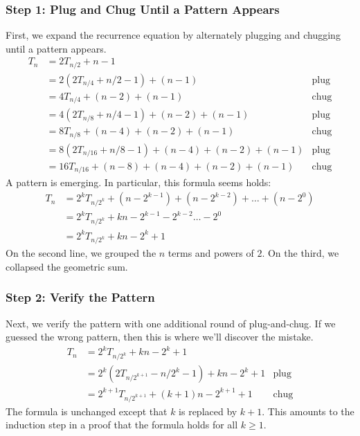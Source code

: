 \subsubsection*{Step 1: Plug and Chug Until a Pattern Appears}

First, we expand the recurrence equation by alternately plugging and
chugging until a pattern appears.
\begin{align*}
T_n & = 2T_{n/2} + n - 1 \\
  & = 2 (2 T_{n/4} + n/2 - 1)  + (n - 1) & \text{plug} \\
  & = 4 T_{n/4} + (n - 2) + (n - 1) & \text{chug} \\
  & = 4 (2 T_{n/8} + n / 4 - 1) + (n - 2) + (n - 1) & \text{plug} \\
  & = 8 T_{n/8} + (n - 4) + (n - 2) + (n - 1) & \text{chug} \\
  & = 8 (2 T_{n/16} + n / 8 - 1) +  (n - 4) + (n - 2) + (n - 1) &
  \text{plug} \\
  & = 16 T_{n/16} + (n - 8) + (n - 4) + (n - 2) + (n - 1) & \text{chug}
\end{align*}
A pattern is emerging.  In particular, this formula seems holds:
\begin{align*}
T_n & = 2^k T_{n/2^k} + (n - 2^{k-1}) + (n - 2^{k -2}) + \ldots + (n -
2^0) \\
  & = 2^k T_{n/2^k} + k n - 2^{k-1}  - 2^{k-2} \ldots - 2^0 \\
  & = 2^k T_{n/2^k} + k n - 2^k + 1
\end{align*}
On the second line, we grouped the $n$ terms and powers of $2$.  On
the third, we collapsed the geometric sum.

\subsubsection*{Step 2:  Verify the Pattern}

Next, we verify the pattern with one additional round of
plug-and-chug.  If we guessed the wrong pattern, then this is where
we'll discover the mistake.
\begin{align*}
T_n & = 2^k T_{n/2^k} + k n - 2^k + 1 \\
 & = 2^k (2 T_{n/2^{k+1}} - n/2^k - 1) + kn - 2^k + 1 & \text{plug} \\
 & = 2^{k+1} T_{n/2^{k+1}}  + (k+ 1) n - 2^{k+1} + 1 & \text{chug}
\end{align*}
The formula is unchanged except that $k$ is replaced by $k+1$.  This
amounts to the induction step in a proof that the formula holds for
all $k \geq 1$.

